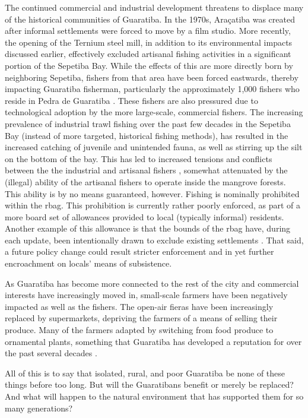 The continued commercial and industrial development threatens to displace many of the historical communities of Guaratiba. In the 1970s, Araçatiba was created after informal settlements were forced to move by a film studio. More recently, the opening of the Ternium steel mill, in addition to its environmental impacts discussed earlier, effectively excluded artisanal fishing activities in a significant portion of the Sepetiba Bay. While the effects of this are more directly born by neighboring Sepetiba, fishers from that area have been forced eastwards, thereby impacting Guaratiba fisherman, particularly the approximately 1,000 fishers who reside in Pedra de Guaratiba \cite{lopesTerritorialidadesEmConflitos2013}. These fishers are also pressured due to technological adoption by the more large-scale, commercial fishers. The increasing prevalence of industrial trawl fishing over the past few decades in the Sepetiba Bay (instead of more targeted, historical fishing methods), has resulted in the increased catching of juvenile and unintended fauna, as well as stirring up the silt on the bottom of the bay. This has led to increased tensions and conflicts between the the industrial and artisanal fishers \cite{begossiMappingSpotsFishing2001}, somewhat attenuated by the (illegal) ability of the artisanal fishers to operate inside the mangrove forests. This ability is by no means guaranteed, however. Fishing is nominally prohibited within the \ac{rbag}. This prohibition is currently rather poorly enforced, as part of a more board set of allowances provided to local (typically informal) residents. Another example of this allowance is that the bounds of the \ac{rbag} have, during each update, been intentionally drawn to exclude existing settlements \cite{castroOSDESAFIOSPLANEJAMENTO2012}. That said, a future policy change could result stricter enforcement and in yet further encroachment on locals’ means of subsistence. 

As Guaratiba has become more connected to the rest of the city and commercial interests have increasingly moved in, small-scale farmers have been negatively impacted as well as the fishers. The open-air fieras have been increasingly replaced by supermarkets, depriving the farmers of a means of selling their produce. Many of the farmers adapted by switching from food produce to ornamental plants, something that Guaratiba has developed a reputation for over the past several decades \cite{fernandesDecodificandoGeografiasPreteritas2010}. 

All of this is to say that isolated, rural, and poor Guaratiba be none of these things before too long. But will the Guaratibans benefit or merely be replaced? And what will happen to the natural environment that has supported them for so many generations?

